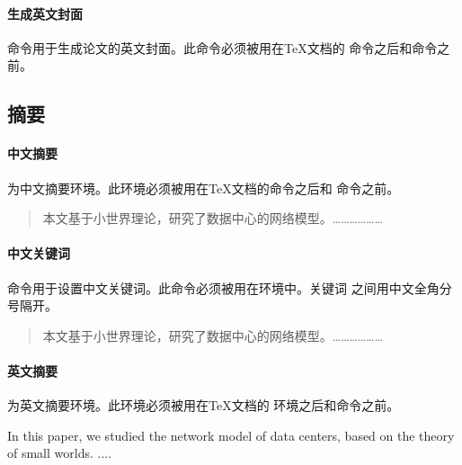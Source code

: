 \paragraph{生成英文封面}

命令用于生成论文的英文封面。此命令必须被用在{\TeX}文档的
命令之后和命令之前。
\begin{tex}
\makeenglishtitle
\end{tex}

\subsection{摘要}

\paragraph{中文摘要}

为中文摘要环境。此环境必须被用在{\TeX}文档的命令之后和
命令之前。
\begin{tex}
\begin{abstract}
本文基于小世界理论，研究了数据中心的网络模型。………………
\end{abstract}
\end{tex}

\paragraph{中文关键词}

命令用于设置中文关键词。此命令必须被用在环境中。关键词
之间用中文全角分号隔开。
\begin{tex}
\begin{abstract}
本文基于小世界理论，研究了数据中心的网络模型。………………
\end{abstract}
\end{tex}

\paragraph{英文摘要}

为英文摘要环境。此环境必须被用在{\TeX}文档的
环境之后和命令之前。
\begin{tex}
\begin{englishabstract}
In this paper, we studied the network model of data centers,
based on the theory of small worlds. ....
\end{englishabstract}
\end{tex}

